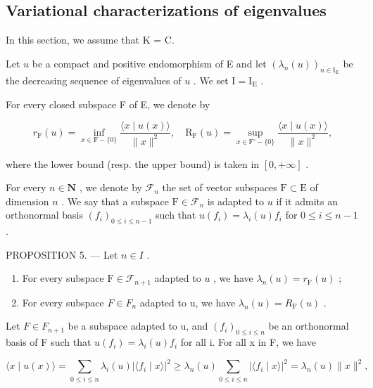 \subsection{Variational characterizations of eigenvalues}

In this section, we assume that K = C.

Let \(u\) be a compact and positive endomorphism of E and let \((\lambda_n(u))_{n\in \mathrm{I_E}}\) be the decreasing sequence of eigenvalues of \(u\) . We set \(\mathrm{I} = \mathrm{I_E}\) .

For every closed subspace F of E, we denote by

\[
r _ {\mathrm{F}} (u) = \inf _ {x \in \mathrm{F} - \{0 \}} \frac {\langle x \mid u (x) \rangle}{\| x \| ^ {2}}, \quad \mathrm{R} _ {\mathrm{F}} (u) = \sup _ {x \in \mathrm{F} ^ {\circ} - \{0 \}} \frac {\langle x \mid u (x) \rangle}{\| x \| ^ {2}},
\]

where the lower bound (resp. the upper bound) is taken in \([0, +\infty]\) .

For every \(n \in \mathbf{N}\) , we denote by \(\mathcal{F}_n\) the set of vector subspaces \(\mathrm{F} \subset \mathrm{E}\) of dimension \(n\) . We say that a subspace \(\mathrm{F} \in \mathcal{F}_n\) is adapted to \(u\) if it admits an orthonormal basis \((f_i)_{0 \leqslant i \leqslant n-1}\) such that \(u(f_i) = \lambda_i(u)f_i\) for \(0 \leqslant i \leqslant n-1\) .

PROPOSITION 5. --- Let \(n \in I\) .

\begin{enumerate}
\def\labelenumi{\alph{enumi})}
\item
  For every subspace \(\mathrm{F} \in \mathcal{F}_{n+1}\) adapted to \(u\) , we have \(\lambda_n(u) = r_{\mathrm{F}}(u)\) ;
\item
  For every subspace \(F \in F_{n}\) adapted to u, we have \(\lambda_{n}(u) = R_{\mathrm{F}}(u)\) .
\end{enumerate}

Let \(F \in F_{n+1}\) be a subspace adapted to u, and \((f_i)_{0 \leqslant i \leqslant n}\) be an orthonormal basis of F such that \(u(f_i) = \lambda_i(u)f_i\) for all i. For all x in F, we have

\[
\langle x \mid u (x) \rangle = \sum_ {0 \leqslant i \leqslant n} \lambda_ {i} (u) | \langle f _ {i} \mid x \rangle | ^ {2} \geqslant \lambda_ {n} (u) \sum_ {0 \leqslant i \leqslant n} | \langle f _ {i} \mid x \rangle | ^ {2} = \lambda_ {n} (u) \| x \| ^ {2},
\]

